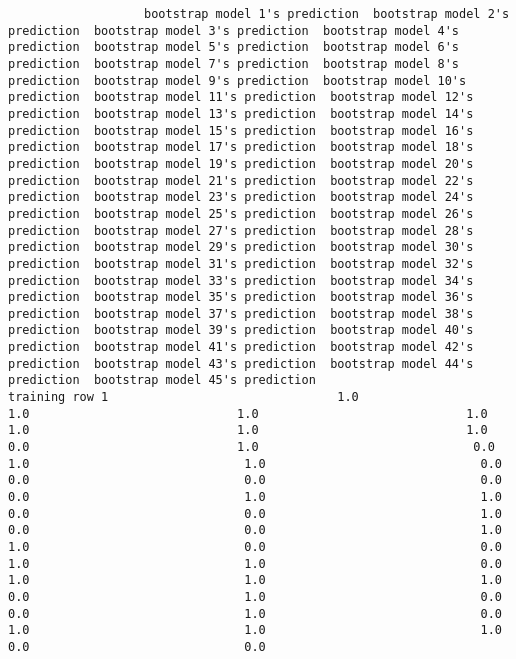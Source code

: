 \documentclass[11pt]{article}
\begin{document}
    
    \begin{verbatim}
                   bootstrap model 1's prediction  bootstrap model 2's prediction  bootstrap model 3's prediction  bootstrap model 4's prediction  bootstrap model 5's prediction  bootstrap model 6's prediction  bootstrap model 7's prediction  bootstrap model 8's prediction  bootstrap model 9's prediction  bootstrap model 10's prediction  bootstrap model 11's prediction  bootstrap model 12's prediction  bootstrap model 13's prediction  bootstrap model 14's prediction  bootstrap model 15's prediction  bootstrap model 16's prediction  bootstrap model 17's prediction  bootstrap model 18's prediction  bootstrap model 19's prediction  bootstrap model 20's prediction  bootstrap model 21's prediction  bootstrap model 22's prediction  bootstrap model 23's prediction  bootstrap model 24's prediction  bootstrap model 25's prediction  bootstrap model 26's prediction  bootstrap model 27's prediction  bootstrap model 28's prediction  bootstrap model 29's prediction  bootstrap model 30's prediction  bootstrap model 31's prediction  bootstrap model 32's prediction  bootstrap model 33's prediction  bootstrap model 34's prediction  bootstrap model 35's prediction  bootstrap model 36's prediction  bootstrap model 37's prediction  bootstrap model 38's prediction  bootstrap model 39's prediction  bootstrap model 40's prediction  bootstrap model 41's prediction  bootstrap model 42's prediction  bootstrap model 43's prediction  bootstrap model 44's prediction  bootstrap model 45's prediction
training row 1                                1.0                             1.0                             1.0                             1.0                             1.0                             1.0                             1.0                             0.0                             1.0                              0.0                              1.0                              1.0                              0.0                              0.0                              0.0                              0.0                              0.0                              1.0                              1.0                              0.0                              0.0                              1.0                              0.0                              0.0                              1.0                              1.0                              0.0                              0.0                              1.0                              1.0                              0.0                              1.0                              1.0                              1.0                              0.0                              1.0                              0.0                              0.0                              1.0                              0.0                              1.0                              1.0                              1.0                              0.0                              0.0

\end{verbatim}
\end{document}
